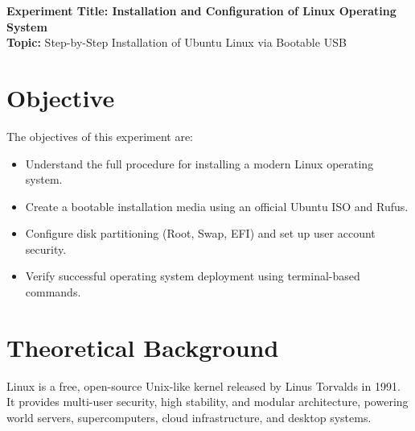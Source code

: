 \documentclass[10pt,a4paper,portrait]{article}
\begin{document}
\raggedbottom
\thispagestyle{firstpage}

\begin{center}
  {\Large\bfseries\sffamily\color{primary} Experiment Title: Installation and Configuration of Linux Operating System}\\[3pt]
  {\normalsize\sffamily\textbf{Topic:} Step-by-Step Installation of Ubuntu Linux via Bootable USB}
\end{center}
\vspace{-4pt}

\section{Objective}
The objectives of this experiment are:
\begin{itemize}[noitemsep,topsep=1pt,leftmargin=1.2em]
  \item Understand the full procedure for installing a modern Linux operating system.
  \item Create a bootable installation media using an official Ubuntu ISO and Rufus.
  \item Configure disk partitioning (Root, Swap, EFI) and set up user account security.
  \item Verify successful operating system deployment using terminal-based commands.
\end{itemize}

\section{Theoretical Background}
Linux is a free, open-source Unix-like kernel released by Linus Torvalds in 1991. It provides multi-user security, high stability, and modular architecture, powering world servers, supercomputers, cloud infrastructure, and desktop systems.
\end{document}
